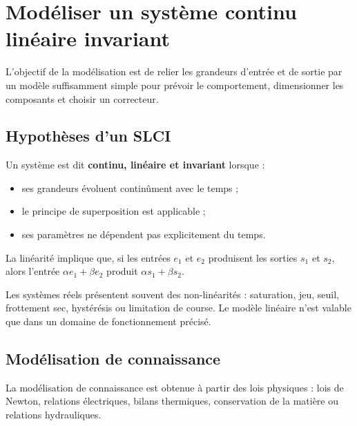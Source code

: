 
\section{Modéliser un système continu linéaire invariant}\label{sec:sa-slci}

L'objectif de la modélisation est de relier les grandeurs d'entrée et de sortie par un modèle suffisamment simple pour prévoir le comportement, dimensionner les composants et choisir un correcteur.

\SACarteModelisation

\subsection{Hypothèses d'un SLCI}

Un système est dit \textbf{continu, linéaire et invariant} lorsque :

\begin{itemize}
  \item ses grandeurs évoluent continûment avec le temps ;
  \item le principe de superposition est applicable ;
  \item ses paramètres ne dépendent pas explicitement du temps.
\end{itemize}

La linéarité implique que, si les entrées $e_1$ et $e_2$ produisent les sorties $s_1$ et $s_2$, alors l'entrée $\alpha e_1+\beta e_2$ produit $\alpha s_1+\beta s_2$.

\begin{SAattention}
Les systèmes réels présentent souvent des non-linéarités : saturation, jeu, seuil, frottement sec, hystérésis ou limitation de course. Le modèle linéaire n'est valable que dans un domaine de fonctionnement précisé.
\end{SAattention}

\subsection{Modélisation de connaissance}

La modélisation de connaissance est obtenue à partir des lois physiques : lois de Newton, relations électriques, bilans thermiques, conservation de la matière ou relations hydrauliques.

